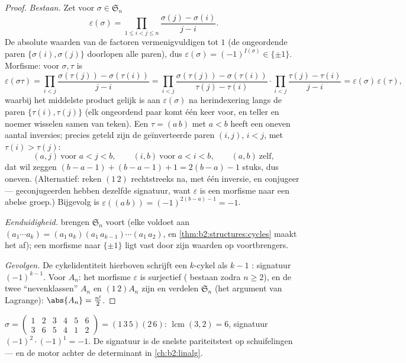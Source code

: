 \begin{proof}
\emph{Bestaan.} Zet voor $\sigma \in \mathfrak{S}_n$
\[
\varepsilon(\sigma)
= \prod_{1 \leq i < j \leq n}
\frac{\sigma(j) - \sigma(i)}{j - i} .
\]
De absolute waarden van de factoren vermenigvuldigen tot $1$ (de
ongeordende paren $\{\sigma(i), \sigma(j)\}$ doorlopen alle
paren), dus $\varepsilon(\sigma) = (-1)^{I(\sigma)} \in
\{\pm1\}$. Morfisme: voor $\sigma, \tau$ is
\[
\varepsilon(\sigma\tau)
= \prod_{i<j} \frac{\sigma(\tau(j)) - \sigma(\tau(i))}{j - i}
= \prod_{i<j} \frac{\sigma(\tau(j)) - \sigma(\tau(i))}{\tau(j) -
\tau(i)} \cdot \prod_{i<j} \frac{\tau(j) - \tau(i)}{j - i}
= \varepsilon(\sigma)\,\varepsilon(\tau),
\]
waarbij het middelste product gelijk is aan
$\varepsilon(\sigma)$ na herindexering langs de paren
$\{\tau(i), \tau(j)\}$ (elk ongeordend paar komt één keer voor,
en teller en noemer wisselen samen van teken). Een 
$\tau = (a\,b)$ met $a < b$ heeft een oneven aantal inversies;
precies geteld zijn de geïnverteerde paren $(i, j)$, $i < j$, met
$\tau(i) > \tau(j)$:
\[
(a, j) \ \text{voor } a < j < b, \qquad
(i, b) \ \text{voor } a < i < b, \qquad
(a, b) \ \text{zelf},
\]
dat wil zeggen $(b - a - 1) + (b - a - 1) + 1 = 2(b - a) - 1$
stuks, dus oneven. (Alternatief: reken $(1\,2)$ rechtstreeks na,
met één inversie, en conjugeer --- geconjugeerden hebben dezelfde
signatuur, want $\varepsilon$ is een morfisme naar een abelse
groep.) Bijgevolg is $\varepsilon((a\,b)) = (-1)^{2(b-a)-1} = -1$.

\emph{Eenduidigheid.}  brengen $\mathfrak{S}_n$
voort (elke  voldoet aan $(a_1\cdots a_k) =
(a_1\,a_k)(a_1\,a_{k-1})\cdots(a_1\,a_2)$, en
\cref{thm:b2:structures:cycles} maakt het af); een morfisme naar
$\{\pm1\}$ ligt vast door zijn waarden op voortbrengers.

\emph{Gevolgen.} De cykelidentiteit hierboven schrijft een
$k$-cykel als $k - 1$ : signatuur $(-1)^{k-1}$. Voor
$A_n$: het morfisme $\varepsilon$ is surjectief (
bestaan zodra $n \geq 2$), en de twee ``nevenklassen'' $A_n$ en
$(1\,2)A_n$ zijn  en verdelen $\mathfrak{S}_n$ (het
argument van Lagrange): $\abs{A_n} = \frac{n!}{2}$.
\end{proof}

\begin{example}\label{ex:b2:structures:snexample}
$\sigma = \begin{pmatrix} 1&2&3&4&5&6\\ 3&6&5&4&1&2 \end{pmatrix}
= (1\,3\,5)(2\,6)$:  $\operatorname{lcm}(3,2) = 6$, signatuur
$(-1)^{2}\cdot(-1)^{1} = -1$. De signatuur is de snelste
pariteitstest op schuifelingen --- en de motor achter de
determinant in \cref{ch:b2:linalg}.
\end{example}

